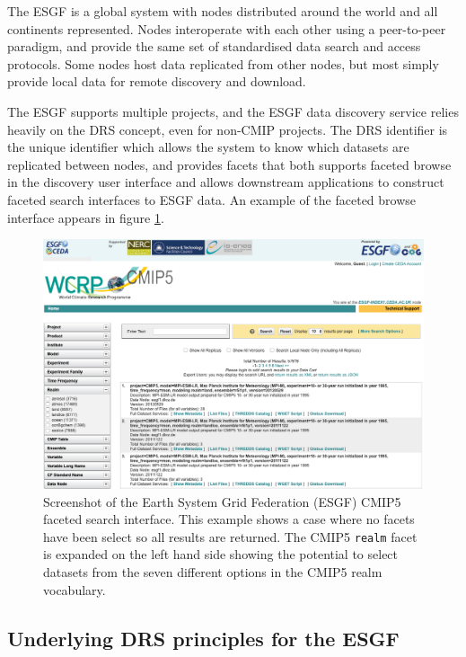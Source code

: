 \documentclass[final,1p,times,twocolumn,authoryear]{elsarticle}
\begin{document}
The ESGF is a global system with nodes distributed around the world and all continents represented.
Nodes interoperate with each other using a peer-to-peer paradigm, and provide the same set of standardised data search and access protocols.
Some nodes host data replicated from other nodes, but most simply provide local data for remote discovery and download. 

The ESGF supports multiple projects, and the ESGF data discovery service relies heavily on the DRS concept, even for non-CMIP projects.  The DRS identifier is the unique identifier which allows the system to know which datasets are replicated between nodes, and provides facets that both supports faceted browse in the discovery user interface and allows downstream applications to construct faceted search interfaces to ESGF data.  An example of the faceted browse interface appears in figure \ref{fig:search-esgf-cmip5}.

\begin{figure}[ht!] 
\centering
\includegraphics[scale=0.32]{images/esgf_cmip5.png}
\caption{Screenshot of the Earth System Grid Federation (ESGF) CMIP5 faceted search interface. This example shows a case where no facets have been select so all results are returned. The CMIP5 \texttt{realm} facet is  expanded on the left hand side showing the potential to select datasets from the seven different options in the CMIP5 realm vocabulary.\label{fig:search-esgf-cmip5} }
\end{figure}


\subsection{Underlying DRS principles for the ESGF}
\end{document}
